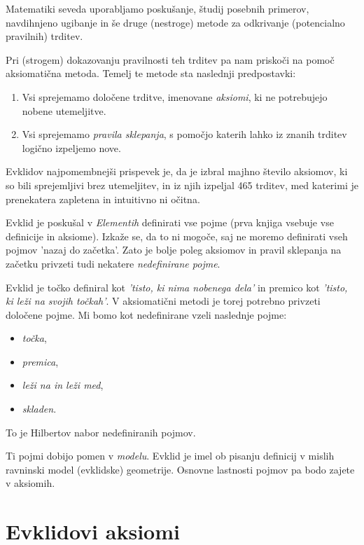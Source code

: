     Matematiki seveda uporabljamo poskušanje, študij posebnih primerov, navdihnjeno ugibanje in še druge (nestroge) metode za odkrivanje (potencialno pravilnih) trditev.

    Pri (strogem) dokazovanju pravilnosti teh trditev pa nam priskoči na pomoč aksiomatična metoda. Temelj te metode sta naslednji predpostavki:
        \begin{enumerate}
            \item Vsi sprejemamo določene trditve, imenovane \textit{aksiomi}, ki ne potrebujejo nobene utemeljitve.
            \item Vsi sprejemamo \textit{pravila sklepanja}, s pomočjo katerih lahko iz znanih trditev logično izpeljemo nove.
        \end{enumerate}

    Evklidov najpomembnejši prispevek je, da je izbral majhno število aksiomov, ki so bili sprejemljivi brez utemeljitev, in iz njih izpeljal 465 trditev, med katerimi je prenekatera zapletena in intuitivno ni očitna.

    Evklid je poskušal v \textit{Elementih} definirati vse pojme (prva knjiga vsebuje vse definicije in aksiome). Izkaže se, da to ni mogoče, saj ne moremo definirati vseh pojmov 'nazaj do začetka'. Zato je bolje poleg aksiomov in pravil sklepanja na začetku privzeti tudi nekatere \textit{nedefinirane pojme}.

    Evklid je točko definiral kot \textit{'tisto, ki nima nobenega dela'} in premico kot \textit{'tisto, ki leži na svojih točkah'}. V aksiomatični metodi je torej potrebno privzeti določene pojme. Mi bomo kot nedefinirane vzeli naslednje pojme:
        \begin{itemize}
            \item \textit{točka},
            \item \textit{premica},
            \item \textit{leži na in leži med},
            \item \textit{skladen}.
        \end{itemize}
    To je Hilbertov nabor nedefiniranih pojmov.

    Ti pojmi dobijo pomen v \textit{modelu}. Evklid je imel ob pisanju definicij v mislih ravninski model (evklidske) geometrije. Osnovne lastnosti pojmov pa bodo zajete v aksiomih.


\newpage

\section{Evklidovi aksiomi}

